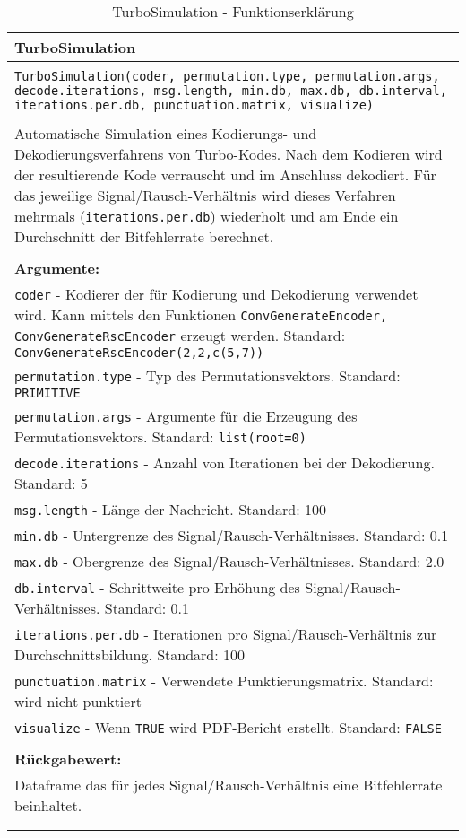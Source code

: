 \begin{longtable}{|p{\textwidth}|}
\hline
\rowcolor{lightblue}TurboSimulation\\
\hline
\\
\texttt{TurboSimulation(coder, permutation.type, permutation.args, decode.iterations, msg.length, min.db, max.db, db.interval, iterations.per.db, punctuation.matrix, visualize)}\\
\\
Automatische Simulation eines Kodierungs- und Dekodierungsverfahrens von Turbo-Kodes. Nach dem Kodieren wird der resultierende Kode verrauscht und im Anschluss dekodiert. Für das jeweilige Signal/Rausch-Verhältnis wird dieses Verfahren mehrmals (\texttt{iterations.per.db}) wiederholt und am Ende ein Durchschnitt der Bitfehlerrate berechnet.\\
\\
\textbf{Argumente:}\\
\texttt{coder} - Kodierer der für Kodierung und Dekodierung verwendet wird. Kann mittels den Funktionen \texttt{ConvGenerateEncoder, ConvGenerateRscEncoder} erzeugt werden. Standard: \texttt{ConvGenerateRscEncoder(2,2,c(5,7))}\\
\texttt{permutation.type} - Typ des Permutationsvektors. Standard: \texttt{PRIMITIVE}\\
\texttt{permutation.args} - Argumente für die Erzeugung des Permutationsvektors. Standard: \texttt{list(root=0)}\\
\texttt{decode.iterations} - Anzahl von Iterationen bei der Dekodierung. Standard: 5\\
\texttt{msg.length} - Länge der Nachricht. Standard: 100\\
\texttt{min.db} - Untergrenze des Signal/Rausch-Verhältnisses. Standard: 0.1\\
\texttt{max.db} - Obergrenze des Signal/Rausch-Verhältnisses. Standard: 2.0\\
\texttt{db.interval} - Schrittweite pro Erhöhung des Signal/Rausch-Verhältnisses. Standard: 0.1\\
\texttt{iterations.per.db} - Iterationen pro Signal/Rausch-Verhältnis zur Durchschnittsbildung. Standard: 100\\
\texttt{punctuation.matrix} - Verwendete Punktierungsmatrix. Standard: wird nicht punktiert\\
\texttt{visualize} - Wenn \texttt{TRUE} wird PDF-Bericht erstellt. Standard: \texttt{FALSE}\\
\\
\textbf{Rückgabewert:}\\
Dataframe das für jedes Signal/Rausch-Verhältnis eine Bitfehlerrate beinhaltet.\\
\\
\hline
\caption[TurboSimulation]{TurboSimulation - Funktionserklärung}
\end{longtable}